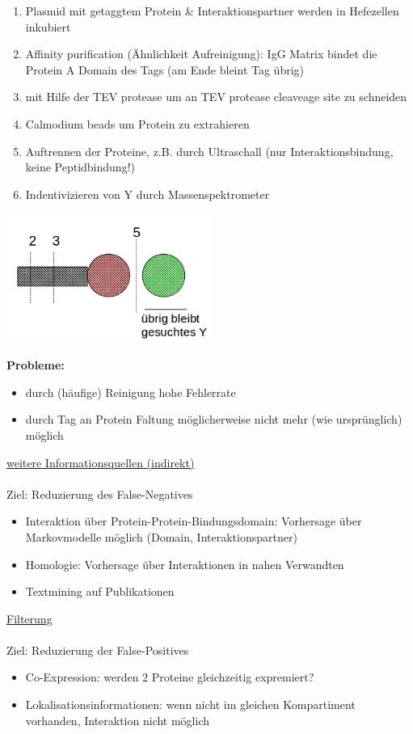 \begin{enumerate}
	\item Plasmid mit getaggtem Protein \& Interaktionspartner werden in Hefezellen inkubiert
	\item Affinity purification (Ähnlichkeit Aufreinigung): IgG Matrix bindet die Protein A Domain des Tags (am Ende bleint Tag übrig)
	\item mit Hilfe der TEV protease um an TEV protease cleaveage site zu schneiden
	\item Calmodium beads um Protein zu extrahieren
	\item Auftrennen der Proteine, z.B. durch Ultraschall (nur Interaktionsbindung, keine Peptidbindung!)
	\item Indentivizieren von Y durch Massenspektrometer
\end{enumerate}

\includegraphics[width=0.5\textwidth]{lectures/160513/pix/3.jpg}

\textbf{Probleme:}
\begin{itemize}
	\item durch (häufige) Reinigung hohe Fehlerrate
	\item durch Tag an Protein Faltung möglicherweise nicht mehr (wie ursprünglich) möglich
\end{itemize}

\underline{weitere Informationsquellen (indirekt)}\\\\
Ziel: Reduzierung des False-Negatives
\begin{itemize}
	\item Interaktion über Protein-Protein-Bindungsdomain: Vorhersage über Markovmodelle möglich (Domain, Interaktionspartner)
	\item Homologie: Vorhersage über Interaktionen in nahen Verwandten
	\item Textmining auf Publikationen
\end{itemize}

\underline{Filterung}\\\\
Ziel: Reduzierung der False-Positives
\begin{itemize}
	\item Co-Expression: werden 2 Proteine gleichzeitig expremiert?
	\item Lokalisationsinformationen: wenn nicht im gleichen Kompartiment vorhanden, Interaktion nicht möglich
\end{itemize}

